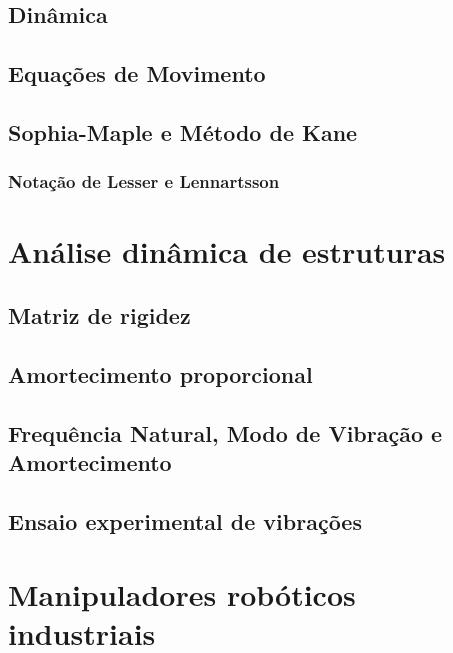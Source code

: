 \subsection{Dinâmica}

\subsection{Equações de Movimento}

\subsection{Sophia-Maple e Método de Kane}\label{sec::sophia-kane}

\subsubsection{Notação de Lesser e Lennartsson}


\section{Análise dinâmica de estruturas}

\subsection{Matriz de rigidez} \label{sec::rigidez}

\subsection{Amortecimento proporcional} \label{sec::amortecimento}

\subsection{Frequência Natural, Modo de Vibração e Amortecimento}
\label{sec::param_mod}

\subsection{Ensaio experimental de vibrações}


\section{Manipuladores robóticos industriais}\label{sec::manind}

